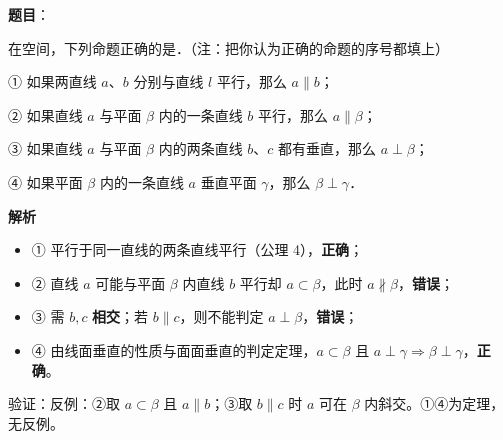 \begin{answer}

\textbf{题目}：

在空间，下列命题正确的是\gkblank{}．（注：把你认为正确的命题的序号都填上）

① 如果两直线 $a$、$b$ 分别与直线 $l$ 平行，那么 $a \parallel b$；

② 如果直线 $a$ 与平面 $\beta$ 内的一条直线 $b$ 平行，那么 $a \parallel \beta$；

③ 如果直线 $a$ 与平面 $\beta$ 内的两条直线 $b$、$c$ 都有垂直，那么 $a \perp \beta$；

④ 如果平面 $\beta$ 内的一条直线 $a$ 垂直平面 $\gamma$，那么 $\beta \perp \gamma$．

\textbf{解析}

\begin{itemize}
\item ① 平行于同一直线的两条直线平行（公理 4），\textbf{正确}；
\item ② 直线 $a$ 可能与平面 $\beta$ 内直线 $b$ 平行却 $a\subset\beta$，此时 $a\not\parallel\beta$，\textbf{错误}；
\item ③ 需 $b,c$ \textbf{相交}；若 $b\parallel c$，则不能判定 $a\perp\beta$，\textbf{错误}；
\item ④ 由线面垂直的性质与面面垂直的判定定理，$a\subset\beta$ 且 $a\perp\gamma\Rightarrow\beta\perp\gamma$，\textbf{正确}。
\end{itemize}

验证：反例：②取 $a\subset\beta$ 且 $a\parallel b$；③取 $b\parallel c$ 时 $a$ 可在 $\beta$ 内斜交。①④为定理，无反例。


\par\medskip

\end{answer}
